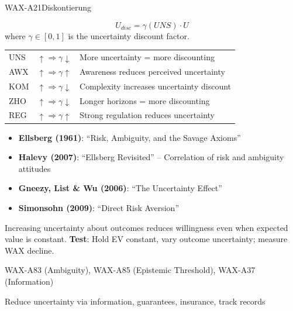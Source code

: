 \begin{axiomspec}{WAX-A21}{Diskontierung}

\begin{equation}
U_{disc} = \gamma(UNS) \cdot U
\end{equation}
where $\gamma \in [0,1]$ is the uncertainty discount factor.

\begin{tabular}{lll}
UNS & $\uparrow \Rightarrow \gamma \downarrow$ & More uncertainty = more discounting \\
AWX & $\uparrow \Rightarrow \gamma \uparrow$ & Awareness reduces perceived uncertainty \\
KOM & $\uparrow \Rightarrow \gamma \downarrow$ & Complexity increases uncertainty discount \\
ZHO & $\uparrow \Rightarrow \gamma \downarrow$ & Longer horizons = more discounting \\
REG & $\uparrow \Rightarrow \gamma \uparrow$ & Strong regulation reduces uncertainty \\
\end{tabular}

\begin{itemize}
\item \textbf{Ellsberg (1961)}: ``Risk, Ambiguity, and the Savage Axioms''
\item \textbf{Halevy (2007)}: ``Ellsberg Revisited'' -- Correlation of risk and ambiguity attitudes
\item \textbf{Gneezy, List \& Wu (2006)}: ``The Uncertainty Effect''
\item \textbf{Simonsohn (2009)}: ``Direct Risk Aversion''
\end{itemize}

Increasing uncertainty about outcomes reduces willingness even when expected value is constant.
\textbf{Test}: Hold EV constant, vary outcome uncertainty; measure WAX decline.

WAX-A83 (Ambiguity), WAX-A85 (Epistemic Threshold), WAX-A37 (Information)

Reduce uncertainty via information, guarantees, insurance, track records

\end{axiomspec}


